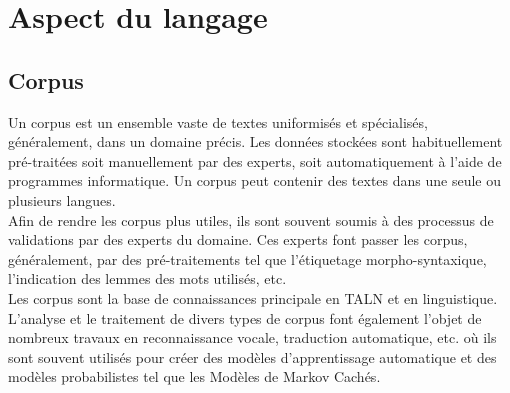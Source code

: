    
\section{Aspect du langage}
 
    \subsection{Corpus}
    Un corpus est un ensemble vaste de textes uniformisés et spécialisés, généralement, dans un domaine précis.
    Les données stockées sont habituellement pré-traitées soit manuellement par des experts, soit automatiquement à l'aide de programmes informatique. Un corpus peut contenir des textes dans une seule ou plusieurs langues.\\ 
    Afin de rendre les corpus plus utiles, ils sont souvent soumis à des processus de validations par des experts du domaine. Ces experts font passer les corpus, généralement, par des pré-traitements tel que l'étiquetage morpho-syntaxique, l'indication des lemmes des mots utilisés, etc.\\
    Les corpus sont la base de connaissances principale en TALN et en linguistique. L'analyse et le traitement de divers types de corpus font également l'objet de nombreux travaux en reconnaissance vocale, traduction automatique, etc. où ils sont souvent utilisés pour créer des modèles d'apprentissage automatique et des modèles probabilistes tel que les Modèles de Markov Cachés.


